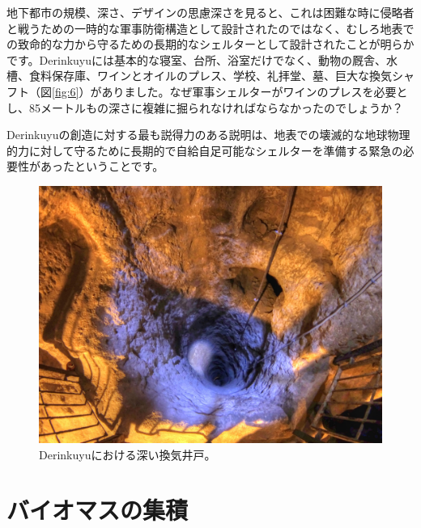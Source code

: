 \documentclass[10pt,twocolumn,letterpaper]{article}
\begin{document}
地下都市の規模、深さ、デザインの思慮深さを見ると、これは困難な時に侵略者と戦うための一時的な軍事防衛構造として設計されたのではなく、むしろ地表での致命的な力から守るための長期的なシェルターとして設計されたことが明らかです。Derinkuyuには基本的な寝室、台所、浴室だけでなく、動物の厩舎、水槽、食料保存庫、ワインとオイルのプレス、学校、礼拝堂、墓、巨大な換気シャフト（図\ref{fig:6}）がありました。なぜ軍事シェルターがワインのプレスを必要とし、85メートルもの深さに複雑に掘られなければならなかったのでしょうか？

Derinkuyuの創造に対する最も説得力のある説明は、地表での壊滅的な地球物理的力に対して守るために長期的で自給自足可能なシェルターを準備する緊急の必要性があったということです。

\begin{figure}[t]
\begin{center}
   \includegraphics[width=1\linewidth]{derinkuyu-air.jpg}
\end{center}
   \caption{Derinkuyuにおける深い換気井戸\cite{53}。}
\label{fig:6}
\label{fig:onecol}
\end{figure}

\section{バイオマスの集積}
\end{document}
